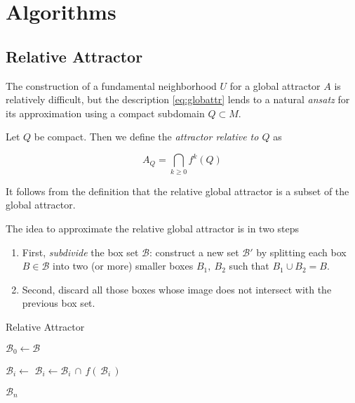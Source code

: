 \section{Algorithms}


\subsection{Relative Attractor}

The construction of a fundamental neighborhood $U$ for a global attractor $A$ is
relatively difficult, but the description \autoref{eq:globattr} lends to 
a natural \emph{ansatz} for its approximation using a compact subdomain $Q \subset M$. \\

\begin{definition}
    Let $Q$ be compact. Then we define the \emph{attractor relative to $Q$} as

    \begin{equation}
        A_Q = \bigcap\limits_{k \geq 0} f^k (Q)
    \end{equation}

\end{definition}

\begin{remark}
    It follows from the definition that the relative global attractor is a subset of the 
    global attractor.\\
\end{remark}

The idea to approximate the relative global attractor is in two steps

\begin{enumerate}
    \item First, \emph{subdivide} the box set $\mathcal{B}$: construct a new set 
    $\mathcal{B}'$ by splitting each box $B \in \mathcal{B}$ into two (or more) 
    smaller boxes $B_1,\ B_2$ such that $B_1 \cup B_2 = B$. 
    \item Second, discard all those boxes whose image does not intersect with the 
    previous box set. 
\end{enumerate}

\begin{algorithm}
    \caption{Relative Attractor}
    \label{alg:relativeattractor}

    \begin{algorithmic}[1]
        \State $\mathcal{B}_0 \gets \mathcal{B}$

            \State $\mathcal{B}_i \gets$ 
            \State $\mathcal{B}_i \gets \mathcal{B}_i\, \cap\, f (\,\mathcal{B}_i\,)$
        \EndFor

        \State \Return $\mathcal{B}_n$ 
    \end{algorithmic}
\end{algorithm}

